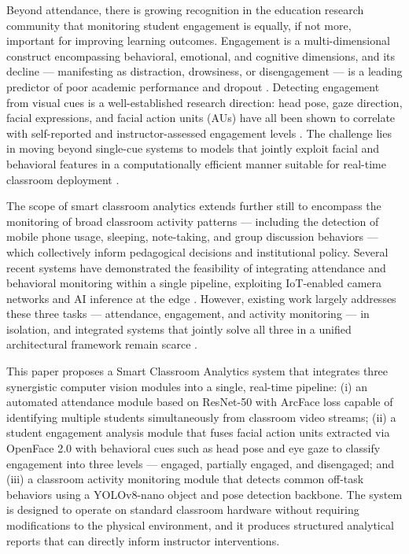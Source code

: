 \documentclass[preprint,12pt]{elsarticle}
\begin{document}
Beyond attendance, there is growing recognition in the education research community that monitoring student engagement is equally, if not more, important for improving learning outcomes. Engagement is a multi-dimensional construct encompassing behavioral, emotional, and cognitive dimensions, and its decline --- manifesting as distraction, drowsiness, or disengagement --- is a leading predictor of poor academic performance and dropout \cite{engagement_springer}. Detecting engagement from visual cues is a well-established research direction: head pose, gaze direction, facial expressions, and facial action units (AUs) have all been shown to correlate with self-reported and instructor-assessed engagement levels \cite{openface}. The challenge lies in moving beyond single-cue systems to models that jointly exploit facial and behavioral features in a computationally efficient manner suitable for real-time classroom deployment \cite{lit_pose_attention_2025, lit_engagement_multimodal_2025}.

The scope of smart classroom analytics extends further still to encompass the monitoring of broad classroom activity patterns --- including the detection of mobile phone usage, sleeping, note-taking, and group discussion behaviors --- which collectively inform pedagogical decisions and institutional policy. Several recent systems have demonstrated the feasibility of integrating attendance and behavioral monitoring within a single pipeline, exploiting IoT-enabled camera networks and AI inference at the edge \cite{disengagement_ieee, robotic_iot, lit_edge_inference_2025}. However, existing work largely addresses these three tasks --- attendance, engagement, and activity monitoring --- in isolation, and integrated systems that jointly solve all three in a unified architectural framework remain scarce \cite{lit_unified_pipeline_2025}.

This paper proposes a Smart Classroom Analytics system that integrates three synergistic computer vision modules into a single, real-time pipeline: (i) an automated attendance module based on ResNet-50 with ArcFace loss capable of identifying multiple students simultaneously from classroom video streams; (ii) a student engagement analysis module that fuses facial action units extracted via OpenFace 2.0 with behavioral cues such as head pose and eye gaze to classify engagement into three levels --- engaged, partially engaged, and disengaged; and (iii) a classroom activity monitoring module that detects common off-task behaviors using a YOLOv8-nano object and pose detection backbone. The system is designed to operate on standard classroom hardware without requiring modifications to the physical environment, and it produces structured analytical reports that can directly inform instructor interventions.
\end{document}
